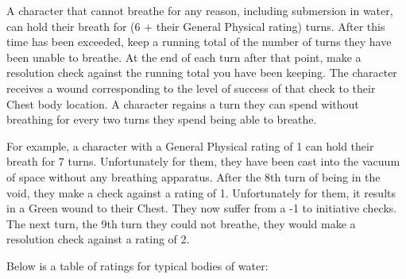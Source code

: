 \documentclass[oneside]{book}
\begin{document}
\begin{multicols}{2}
A character that cannot breathe for any reason, including submersion in water, can hold their breath for (6 + their General Physical rating) turns. After this time has been exceeded, keep a running total of the number of turns they have been unable to breathe. At the end of each turn after that point, make a resolution check against the running total you have been keeping. The character receives a wound corresponding to the level of success of that check to their Chest body location. A character regains a turn they can spend without breathing for every two turns they spend being able to breathe. 

For example, a character with a General Physical rating of 1 can hold their breath for 7 turns. Unfortunately for them, they have been cast into the vacuum of space without any breathing apparatus. After the 8th turn of being in the void, they make a check against a rating of 1. Unfortunately for them, it results in a Green wound to their Chest. They now suffer from a -1 to initiative checks. The next turn, the 9th turn they could not breathe, they would make a resolution check against a rating of 2.

Below is a table of ratings for typical bodies of water:

\begin{center}
\end{center}


\end{multicols}
\end{document}

